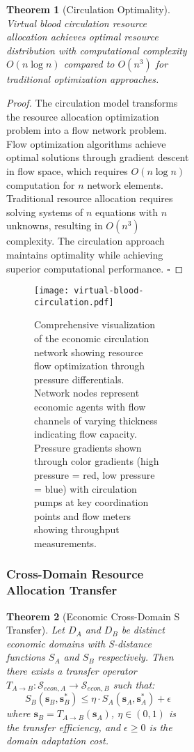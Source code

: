 \documentclass[12pt,a4paper]{article}
\newtheorem{theorem}{Theorem}
\begin{document}
\begin{figure}[H]
\begin{figure}[H]
\begin{figure}[H]
\begin{theorem}[Circulation Optimality]
Virtual blood circulation resource allocation achieves optimal resource distribution with computational complexity $O(n \log n)$ compared to $O(n^3)$ for traditional optimization approaches.
\end{theorem}

\begin{proof}
The circulation model transforms the resource allocation optimization problem into a flow network problem. Flow optimization algorithms achieve optimal solutions through gradient descent in flow space, which requires $O(n \log n)$ computation for $n$ network elements. Traditional resource allocation requires solving systems of $n$ equations with $n$ unknowns, resulting in $O(n^3)$ complexity. The circulation approach maintains optimality while achieving superior computational performance. $\square$
\end{proof}

\begin{figure}[H]
\centering
\texttt{[image: virtual-blood-circulation.pdf]}
\caption{Comprehensive visualization of the economic circulation network showing resource flow optimization through pressure differentials. Network nodes represent economic agents with flow channels of varying thickness indicating flow capacity. Pressure gradients shown through color gradients (high pressure = red, low pressure = blue) with circulation pumps at key coordination points and flow meters showing throughput measurements.}
\label{fig:circulation_network}
\end{figure}

\subsubsection{Cross-Domain Resource Allocation Transfer}

\begin{theorem}[Economic Cross-Domain S Transfer]
Let $D_A$ and $D_B$ be distinct economic domains with S-distance functions $S_A$ and $S_B$ respectively. Then there exists a transfer operator $T_{A \to B}: \mathcal{S}_{econ,A} \to \mathcal{S}_{econ,B}$ such that:
\begin{equation}
S_B(\mathbf{s}_B, \mathbf{s}_B^*) \leq \eta \cdot S_A(\mathbf{s}_A, \mathbf{s}_A^*) + \epsilon
\end{equation}
where $\mathbf{s}_B = T_{A \to B}(\mathbf{s}_A)$, $\eta \in (0, 1)$ is the transfer efficiency, and $\epsilon \geq 0$ is the domain adaptation cost.
\end{theorem}


\end{figure}
\end{figure}
\end{figure}
\end{document}
